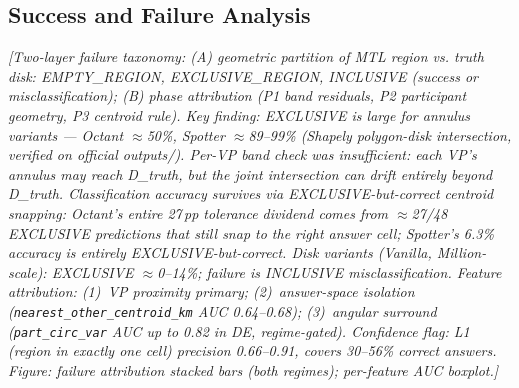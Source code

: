 \subsection{Success and Failure Analysis}
\label{sec:results-failure}
\textit{[Two-layer failure taxonomy: (A) geometric partition of MTL region vs. truth disk:
EMPTY\_REGION, EXCLUSIVE\_REGION, INCLUSIVE (success or misclassification);
(B) phase attribution (P1 band residuals, P2 participant geometry, P3 centroid rule).
Key finding: EXCLUSIVE is large for annulus variants --- Octant $\approx$50\%, Spotter $\approx$89--99\%
(Shapely polygon-disk intersection, verified on official outputs/).
Per-VP band check was insufficient: each VP's annulus may reach D\_truth, but the joint
intersection can drift entirely beyond D\_truth. Classification accuracy survives via
\emph{EXCLUSIVE-but-correct} centroid snapping: Octant's entire 27\,pp tolerance dividend
comes from $\approx$27/48 EXCLUSIVE predictions that still snap to the right answer cell;
Spotter's 6.3\% accuracy is entirely EXCLUSIVE-but-correct.
Disk variants (Vanilla, Million-scale): EXCLUSIVE $\approx$0--14\%; failure is INCLUSIVE misclassification.
Feature attribution: (1)~VP proximity primary; (2)~answer-space isolation (\texttt{nearest\_other\_centroid\_km}
AUC 0.64--0.68); (3)~angular surround (\texttt{part\_circ\_var} AUC up to 0.82 in DE, regime-gated).
Confidence flag: L1 (region in exactly one cell) precision 0.66--0.91, covers 30--56\% correct answers.
Figure: failure attribution stacked bars (both regimes); per-feature AUC boxplot.]}

